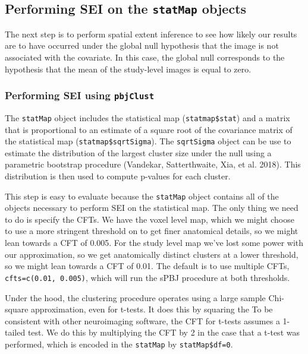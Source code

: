 \documentclass[]{article}
\begin{document}
\subsection{\texorpdfstring{Performing SEI on the \texttt{statMap}
objects}{Performing SEI on the statMap objects}}\label{performing-sei-on-the-statmap-objects}

The next step is to perform spatial extent inference to see how likely
our results are to have occurred under the global null hypothesis that
the image is not associated with the covariate. In this case, the global
null corresponds to the hypothesis that the mean of the study-level
images is equal to zero.

\subsubsection{\texorpdfstring{Performing SEI using
\texttt{pbjClust}}{Performing SEI using pbjClust}}\label{performing-sei-using-pbjclust}

The \texttt{statMap} object includes the statistical map
(\texttt{statmap\$stat}) and a matrix that is proportional to an
estimate of a square root of the covariance matrix of the statistical
map (\texttt{statmap\$sqrtSigma}). The \texttt{sqrtSigma} object can be
use to estimate the distribution of the largest cluster size under the
null using a parametric bootstrap procedure (Vandekar, Satterthwaite,
Xia, et al. 2018). This distribution is then used to compute p-values
for each cluster.

This step is easy to evaluate because the \texttt{statMap} object
contains all of the objects necessary to perform SEI on the statistical
map. The only thing we need to do is specify the CFTs. We have the voxel
level map, which we might choose to use a more stringent threshold on to
get finer anatomical details, so we might lean towards a CFT of 0.005.
For the study level map we've lost some power with our approximation, so
we get anatomically distinct clusters at a lower threshold, so we might
lean towards a CFT of 0.01. The default is to use multiple CFTs,
\texttt{cfts=c(0.01,\ 0.005)}, which will run the sPBJ procedure at both
thresholds.

Under the hood, the clustering procedure operates using a large sample
Chi-square approximation, even for t-tests. It does this by squaring the
To be consistent with other neuroimaging software, the CFT for t-tests
assumes a 1-tailed test. We do this by multiplying the CFT by 2 in the
case that a t-test was performed, which is encoded in the
\texttt{statMap} by \texttt{statMap\$df=0}.
\end{document}
